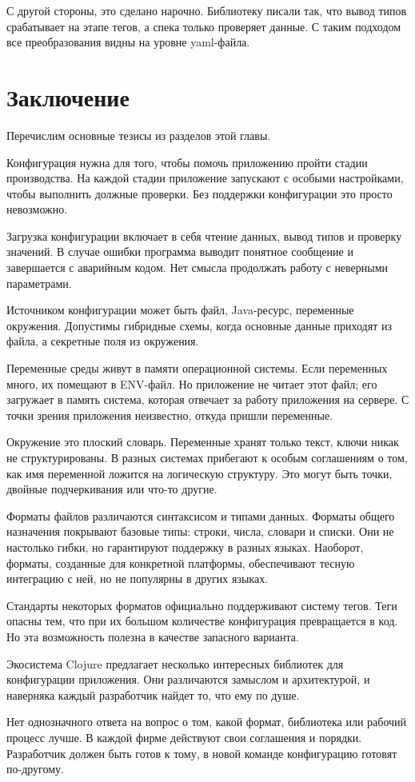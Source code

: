 С другой стороны, это сделано нарочно. Библиотеку писали так, что вывод типов
срабатывает на этапе тегов, а спека только проверяет данные. С таким подходом
все преобразования видны на уровне yaml-файла.

\section{Заключение}

Перечислим основные тезисы из разделов этой главы.

Конфигурация нужна для того, чтобы помочь приложению пройти стадии
производства. На каждой стадии приложение запускают с особыми настройками, чтобы
выполнить должные проверки. Без поддержки конфигурации это просто невозможно.

Загрузка конфигурации включает в себя чтение данных, вывод типов и проверку
значений. В случае ошибки программа выводит понятное сообщение и завершается с
аварийным кодом. Нет смысла продолжать работу с неверными параметрами.

Источником конфигурации может быть файл, Java-ресурс, переменные
окружения. Допустимы гибридные схемы, когда основные данные приходят из файла, а
секретные поля из окружения.

Переменные среды живут в памяти операционной системы. Если переменных много, их
помещают в ENV-файл. Но приложение не читает этот файл; его загружает в память
система, которая отвечает за работу приложения на сервере. С точки зрения
приложения неизвестно, откуда пришли переменные.

Окружение это плоский словарь. Переменные хранят только текст, ключи никак не
структурированы. В разных системах прибегают к особым соглашениям о том, как имя
переменной ложится на логическую структуру. Это могут быть точки, двойные
подчеркивания или что-то другие.

Форматы файлов различаются синтаксисом и типами данных. Форматы общего
назначения покрывают базовые типы: строки, числа, словари и списки. Они не
настолько гибки, но гарантируют поддержку в разных языках. Наоборот, форматы,
созданные для конкретной платформы, обеспечивают тесную интеграцию с ней, но не
популярны в других языках.

Стандарты некоторых форматов официально поддерживают систему тегов. Теги опасны
тем, что при их большом количестве конфигурация превращается в код. Но эта
возможность полезна в качестве запасного варианта.

Экосистема Clojure предлагает несколько интересных библиотек для конфигурации
приложения. Они различаются замыслом и архитектурой, и наверняка каждый
разработчик найдет то, что ему по душе.

Нет однозначного ответа на вопрос о том, какой формат, библиотека или рабочий
процесс лучше. В каждой фирме действуют свои соглашения и порядки. Разработчик
должен быть готов к тому, в новой команде конфигурацию готовят по-другому.
